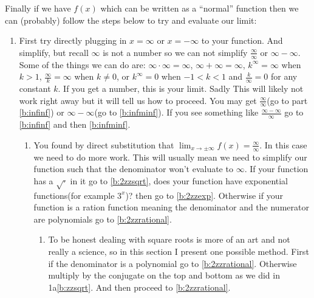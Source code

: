 \documentclass[12pt]{article}
\begin{document}
Finally if we have $f(x)$ which can be written as a ``normal'' function then we can (probably) follow the steps below to try and evaluate our limit:
\begin{enumerate}
    \item \label{b:infstep1} First try directly plugging in $x=\infty$ or $x=-\infty$ to your function. And simplify, but recall $\infty$ is not a number so we can not simplify $\frac{\infty}{\infty}$ or $\infty-\infty$. Some of the things we can do are: $\infty\cdot\infty=\infty$, $\infty+\infty=\infty$, $k^\infty=\infty$ when $k>1$, $\frac{\infty}{k}=\infty$ when $k\neq 0$, or $k^\infty=0$ when $-1<k<1$ and $\frac{k}{\infty}=0$ for any constant $k$. If you get a number, this is your limit. Sadly This will likely not work right away but it will tell us how to proceed. You may get 
    $\frac{\infty}{\infty}$(go to part \ref{b:infinf}) or $\infty-\infty$(go to \ref{b:infminf}). If you see something like $\frac{\infty-\infty}{\infty}$ go to \ref{b:infinf} and then \ref{b:infminf}.
    \begin{enumerate}[label=\alph*.]
        \item \label{b:infinf} You found by direct substitution that $\displaystyle{\lim_{x\to \pm\infty}f(x)}=\frac{\infty}{\infty}$. In this case we need to do more work. This will usually mean we need to simplify our function such that the denominator won't evaluate to $\infty$. If your function has a $\sqrt{\cdot}$ in it go to \ref{b:2zzsqrt}, does your function have exponential functions(for example $3^x$)? then go to \ref{b:2zzexp}. Otherwise if your function is a ration function meaning the denominator and the numerator are polynomials go to \ref{b:2zzrational}.\\
        \begin{enumerate}[label=\roman*.]
            \item \label{b:2zzsqrt} To be honest dealing with square roots is more of an art and not really a science, so in this section I present one possible method. First if the denominator is a polynomial go to \ref{b:2zzrational}. Otherwise multiply by the conjugate on the top and bottom as we did in 1a\ref{b:zzsqrt}. And then proceed to \ref{b:2zzrational}.\\


\end{enumerate}
\end{enumerate}
\end{enumerate}
\end{document}
